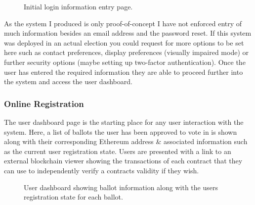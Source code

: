 \documentclass{article}
\begin{document}
\begin{figure}[h]
	\noindent
	\vspace{-0.25cm}
	\caption{Initial login information entry page.}
\end{figure}

As the system I produced is only proof-of-concept I have not enforced entry of much information besides an email address and the password reset. If this system was deployed in an actual election you could request for more options to be set here such as contact preferences, display preferences (visually impaired mode) or further security options (maybe setting up two-factor authentication). Once the user has entered the required information they are able to proceed further into the system and access the user dashboard.
 
\cleardoublepage
\subsubsection{Online Registration}
The user dashboard page is the starting place for any user interaction with the system. Here, a list of ballots the user has been approved to vote in is shown along with their corresponding Ethereum address \& associated information such as the current user registration state. Users are presented with a link to an external blockchain viewer showing the transactions of each contract that they can use to independently verify a contracts validity if they wish.

\begin{figure}[h]
	\noindent
	\vspace{-0.25cm}
	\caption{User dashboard showing ballot information along with the users registration state for each ballot.}
\end{figure}
\end{document}
